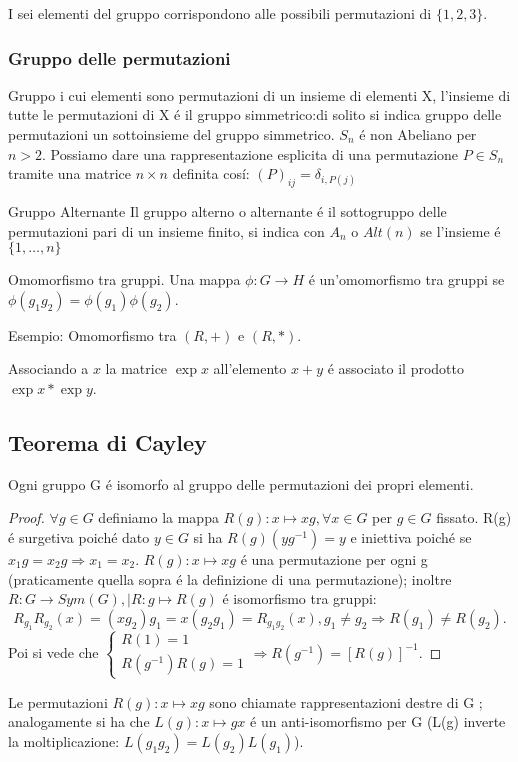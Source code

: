 \documentclass[oneside,12pt]{memoir}
\begin{document}
I sei elementi del gruppo corrispondono alle possibili permutazioni di $\{1,2,3\}$.

\subsubsection{Gruppo delle permutazioni}
Gruppo i cui elementi sono permutazioni di un insieme di elementi X, l'insieme di tutte le permutazioni di X \'e il gruppo simmetrico:di solito si indica gruppo delle permutazioni un sottoinsieme del gruppo simmetrico.
$S_n$ \'e non Abeliano per $n >2$.
Possiamo dare una rappresentazione esplicita di una permutazione $P\in S_n$ tramite una matrice $n\times n$ definita cos\'i: $(P)_{ij}={\delta}_{i,P(j)}$


\begin{definition}{Gruppo Alternante}
Il gruppo alterno o alternante \'e il sottogruppo delle permutazioni pari di un insieme finito, si indica con $A_n$ o $Alt(n)$ se l'insieme \'e $\{1,\ldots ,n\}$
\end{definition}

\begin{definition}{Omomorfismo tra gruppi.}
Una mappa $\phi:G\to H$ \'e un'omomorfismo tra gruppi se $\phi(g_1g_2)=\phi(g_1)\phi(g_2)$.

\end{definition}

Esempio: Omomorfismo tra $(R,+)$ e $(R,*)$.

Associando a $x$ la matrice $\exp{x}$ all'elemento $x+y$ \'e associato il prodotto $\exp{x}*\exp{y}$.

\subsection{Teorema di Cayley}

Ogni gruppo G \'e isomorfo al gruppo delle permutazioni dei propri elementi.

\begin{proof}
$\forall g \in G$ definiamo la mappa $R(g):x\mapsto xg, \forall x \in G$ per $g\in G$ fissato.
R(g) \'e surgetiva poich\'e dato $y\in G$ si ha $R(g)(yg^{-1})=y$ e iniettiva poich\'e se $x_1g=x_2g \Rightarrow x_1=x_2$.
$R(g):x\mapsto xg$ \'e una permutazione per ogni g (praticamente quella sopra \'e la definizione di una permutazione); inoltre $R:G\to Sym(G), | R:g\mapsto R(g)$ \'e isomorfismo tra gruppi: 
\begin{equation*}
R_{g_1}R_{g_2}(x)=(xg_2)g_1=x(g_2g_1)=R_{g_1g_2}(x), g_1\neq g_2 \Rightarrow R(g_1)\neq R(g_2).
\end{equation*}
Poi si vede che $\left\{
\begin{array}{l}
R(1)=1 \\
R(g^{-1})R(g)=1
\end{array}
\right. \Rightarrow R(g^{-1})=[R(g)]^{-1}.$
\end{proof}
Le permutazioni $R(g):x \mapsto xg$ sono chiamate rappresentazioni destre di G ; analogamente si ha che $L(g):x\mapsto gx$ \'e un anti-isomorfismo  per G (L(g) inverte la moltiplicazione: $L(g_1g_2)=L(g_2)L(g_1)$).
\end{document}
